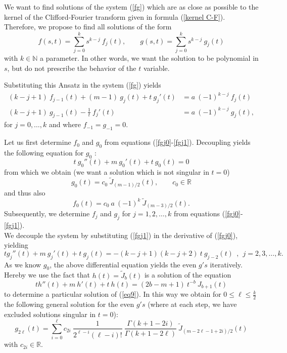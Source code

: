 \documentclass{amsart}
\theoremstyle{remark}
\begin{document}
We want to find solutions of the system (\ref{fg}) which are as close as possible to the kernel of the Clifford-Fourier transform given in formula (\ref{kernel C-F}). Therefore, we propose to find all solutions of the form
\begin{displaymath}
f(s,t)  =  \sum_{j=0}^k s^{k-j} \ f_j(t), \qquad g(s,t)  =  \sum_{j=0}^k s^{k-j} \ g_j(t)
\end{displaymath}
with $k \in \mathbb{N}$ a parameter. In other words, we want the solution to be polynomial in $s$, but do not prescribe the behavior of the $t$ variable.

Substituting this Ansatz in the system (\ref{fg}) yields 
\begin{align}
\label{fgj0}
(k-j+1) \ f_{j-1}(t) + (m-1) \ g_j(t) + t \ g_j'(t)  &=  a \ (-1)^{k-j} \ f_j(t)\\
\label{fgj1}
(k-j+1) \ g_{j-1}(t) -\frac{1}{t} \ f_j'(t)  &=  a \ (-1)^{k-j} \ g_j(t),
\end{align}
for $j = 0, \ldots, k$ and where $f_{-1}=g_{-1}=0$.

Let us first determine $f_0$ and $g_0$ from equations (\ref{fgj0}-\ref{fgj1}). Decoupling yields the following equation for $g_0$ :
\begin{displaymath}
t \ g_0''(t) + m \ g_0'(t) + t \ g_0(t) = 0
\end{displaymath}
from which we obtain (we want a solution which is not singular in $t=0$)
\begin{displaymath}
g_0(t) = c_0 \ \widetilde{J}_{(m-1)/2}(t), \qquad c_0 \in \mathbb{R}
\end{displaymath}
and thus also
\begin{displaymath}
f_0(t) = c_0 \ a \ (-1)^k \ \widetilde{J}_{(m-3)/2}(t).
\end{displaymath}
Subsequently, we determine $f_j$ and $g_j$ for $j=1,2,\ldots,k$ from equations (\ref{fgj0}-\ref{fgj1}).\\
We decouple the system by substituting (\ref{fgj1}) in the derivative of (\ref{fgj0}), yielding
\begin{equation}\label{eq9}
t g_j''(t) + m \ g_j'(t) + t \ g_j(t) = -(k-j+1) (k-j+2) \ t \ g_{j-2}(t) \ \ , \ \ j=2,3,\ldots,k.
\end{equation}
As we know $g_0$, the above differential equation yields the even $g's$ iteratively. Hereby we use the fact that $h(t)=\widetilde{J}_b(t)$ is a solution of the equation
\begin{displaymath}
t h''(t) + m \ h'(t) + t \ h(t) = (2b-m+1) \ t^{-b} \ J_{b+1}(t) 
\end{displaymath}
to determine a particular solution of (\ref{eq9}). In this way we obtain for $0 \leq \ell \leq \frac{k}{2}$ the following general solution for the even $g's$ (where at each step, we have excluded solutions singular in $t=0$):
\begin{displaymath}
g_{2 \ell}(t) = \sum_{i=0}^{\ell} c_{2i} \ \frac{1}{2^{\ell-i} (\ell-i)!} \ \frac{\Gamma(k+1-2i)}{\Gamma(k+1-2\ell)} \  \widetilde{J}_{(m-2\ell-1+2i)/2}(t) 
\end{displaymath}
with $c_{2i} \in \mathbb{R}$.
\end{document}
